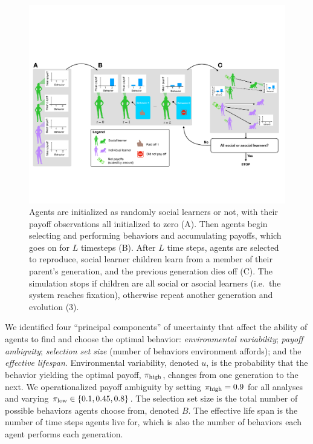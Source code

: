 \documentclass[letterpaper,11.5pt]{scrartcl}
\begin{document}
\begin{figure}
  \caption{Agents are initialized as randomly social learners or not, with their
  payoff observations all initialized to zero (A). Then agents begin selecting
and performing behaviors and accumulating payoffs, which goes on for $L$
timesteps (B). After $L$ time steps, agents are selected to reproduce,
social learner children learn from a member of their parent's generation, and
the previous generation dies off (C). The simulation stops if children are all
social or asocial learners (i.e.\ the system reaches fixation), 
otherwise repeat another generation and evolution (3).}
  \label{fig:schematic}
  \centering
    \includegraphics[width=\textwidth]{Figures/IntraInterGenerationalDynamics.pdf}
\end{figure}


We identified four ``principal components'' of uncertainty that affect the
ability of agents to find and choose the optimal behavior: 
\emph{environmental variability}; \emph{payoff ambiguity}; \emph{selection set size}
(number of behaviors environment affords); and the \emph{effective lifespan}.
Environmental variability, denoted $u$, is the probability that the behavior
yielding the optimal payoff, $\pi_{\mathrm{high}}$, changes from one generation to the next.
We operationalized payoff ambiguity by setting $\pi_{\mathrm{high}} = 0.9$ for all analyses
and varying $\pi_{\mathrm{low}} \in \{0.1, 0.45, 0.8\}$. The selection set size is the
total number of possible behaviors agents choose from, denoted $B$. The 
effective life span is the number of time steps agents live for, which is
also the number of behaviors each agent performs each generation.
\end{document}
